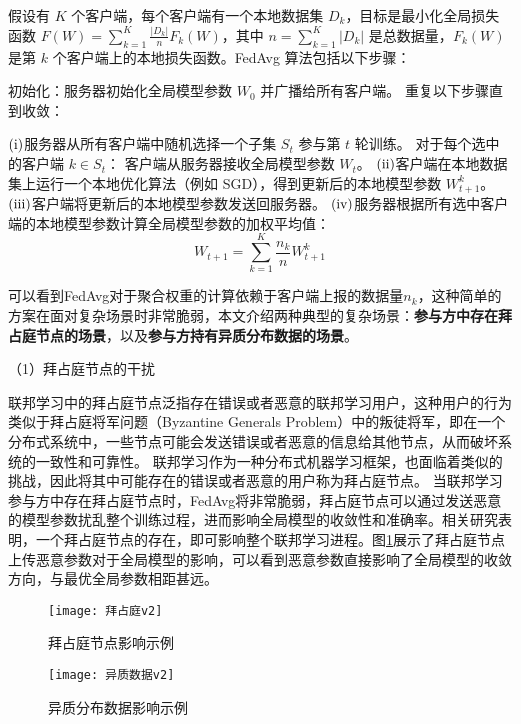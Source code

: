 假设有 $K$ 个客户端，每个客户端有一个本地数据集 ${D}_k$，目标是最小化全局损失函数 $F(W) = \sum_{k=1}^K \frac{|{D}_k|}{n} F_k(W)$，其中 $n = \sum_{k=1}^K |{D}_k|$ 是总数据量，$F_k(W)$ 是第 $k$ 个客户端上的本地损失函数。FedAvg 算法包括以下步骤：

初始化：服务器初始化全局模型参数 $W_0$ 并广播给所有客户端。
重复以下步骤直到收敛：

$(\rm \romannumeral1)$服务器从所有客户端中随机选择一个子集 $S_t$ 参与第 $t$ 轮训练。
对于每个选中的客户端 $k \in S_t$：
客户端从服务器接收全局模型参数 $W_t$。
$(\rm \romannumeral2)$客户端在本地数据集上运行一个本地优化算法（例如 SGD），得到更新后的本地模型参数 $W_{t+1}^k$。
$(\rm \romannumeral3)$客户端将更新后的本地模型参数发送回服务器。
$(\rm \romannumeral4)$服务器根据所有选中客户端的本地模型参数计算全局模型参数的加权平均值：
\begin{equation}
	W_{t+1} = \sum_{k=1}^K \frac{n_k}{n} W_{t+1}^k
\end{equation}

可以看到FedAvg对于聚合权重的计算依赖于客户端上报的数据量$n_k$，这种简单的方案在面对复杂场景时非常脆弱，本文介绍两种典型的复杂场景：\textbf{参与方中存在拜占庭节点的场景}，以及\textbf{参与方持有异质分布数据的场景}。

（1）拜占庭节点的干扰

联邦学习中的拜占庭节点泛指存在错误或者恶意的联邦学习用户，这种用户的行为类似于拜占庭将军问题（Byzantine Generals Problem）中的叛徒将军，即在一个分布式系统中，一些节点可能会发送错误或者恶意的信息给其他节点，从而破坏系统的一致性和可靠性\cite{zhai2021byzantine}。
联邦学习作为一种分布式机器学习框架，也面临着类似的挑战，因此将其中可能存在的错误或者恶意的用户称为拜占庭节点\cite{zhai2020byzantine}。
当联邦学习参与方中存在拜占庭节点时，FedAvg将非常脆弱，拜占庭节点可以通过发送恶意的模型参数扰乱整个训练过程，进而影响全局模型的收敛性和准确率。相关研究表明，一个拜占庭节点的存在，即可影响整个联邦学习进程\cite{blanchard2017machine}。图\ref{byzantine}展示了拜占庭节点上传恶意参数对于全局模型的影响，可以看到恶意参数直接影响了全局模型的收敛方向，与最优全局参数相距甚远。

\begin{figure}[htbp]
	\centering
	\texttt{[image: 拜占庭v2]}
	\caption{拜占庭节点影响示例}
	\label{byzantine}
\end{figure}

\begin{figure}[htbp]
	\centering
	\texttt{[image: 异质数据v2]}
	\caption{异质分布数据影响示例}
	\label{non-iid}
\end{figure}

